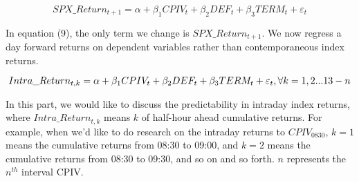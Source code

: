 \begin{equation} \label{eq:1dayahead}
SPX\_Return_{t+1} = \alpha + \beta _{1}CPIV_{t} + \beta _{2}DEF_{t} + \beta _{3}TERM_{t} + \varepsilon _{t}
\end{equation}

In equation (9), the only term we change is $SPX\_Return_{t+1}$. We now regress a day forward returns on dependent variables rather than contemporaneous index returns. 

\begin{equation}
\small
Intra\_Return_{t, k} = \alpha + \beta _{1}CPIV_{t} + \beta _{2}DEF_{t} + \beta _{3}TERM_{t} + \varepsilon _{t},    
\forall k = 1, 2...13-n  
\end{equation}

In this part, we would like to discuss the predictability in intraday index returns, where $Intra\_Return_{t, k}$ means $k$ of half-hour ahead cumulative returns. For example, when we'd like to do research on the intraday returns to $CPIV_{0830}$, $k = 1$ means the cumulative returns from 08:30 to 09:00, and  $k = 2$ means the cumulative returns from 08:30 to 09:30, and so on and so forth. $n$ represents the $n^{th}$ interval CPIV.





